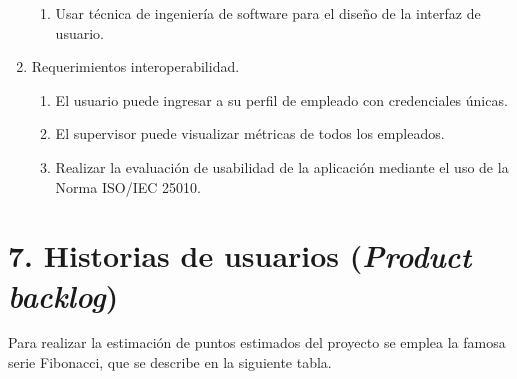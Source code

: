\documentclass[
11pt, %
]{charter}
\begin{document}
\begin{enumerate}
\begin{enumerate}
			\item Usar técnica de ingeniería de software para el diseño de la interfaz de usuario.
		\end{enumerate}
	\item Requerimientos interoperabilidad.
			\begin{enumerate}
			\item El usuario puede ingresar a su perfil de empleado con credenciales únicas.
			\item El supervisor puede visualizar métricas de todos los empleados.
			\item Realizar la evaluación de usabilidad de la aplicación mediante el uso de la Norma ISO/IEC 25010.
		\end{enumerate}
\end{enumerate}



\section{7. Historias de usuarios (\textit{Product backlog})}
\label{sec:backlog}


Para realizar la estimación de puntos estimados del proyecto se emplea la famosa serie Fibonacci, que se describe en la siguiente tabla.
\end{document}

